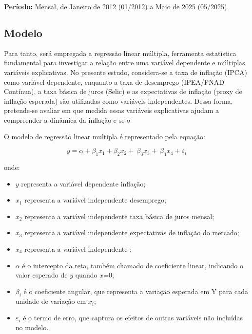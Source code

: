 \documentclass[12pt,oneside]{abntex2}
\begin{document}
\textbf{Período:} Mensal, de Janeiro de 2012 (01/2012) a Maio de 2025 (05/2025).
\medskip

\subsection{\textbf{Modelo}}

Para tanto, será empregada a regressão linear múltipla, ferramenta estatística fundamental para investigar a relação entre uma variável dependente e múltiplas variáveis explicativas. No presente estudo, considera-se a taxa de inflação (IPCA) como variável dependente, enquanto a taxa de desemprego (IPEA/PNAD Contínua), a taxa básica de juros (Selic) e as expectativas de inflação (proxy de inflação esperada) são utilizadas como variáveis independentes. Dessa forma, pretende-se avaliar em que medida essas variáveis explicativas ajudam a compreender a dinâmica da inflação e se o

O modelo de regressão linear multipla é representado pela equação:

\[
y = \alpha + \beta_1 x_1 + \beta_2 x_2 + \ \beta_3 x_3  +\ \beta_4 x_4 + \varepsilon_i
\]

onde:
\begin{itemize}
    \item $y$ representa a variável dependente inflação;

    \item $x_1$ representa a variável independente desemprego;

    \item $x_2$ representa a variável independente taxa básica de juros mensal;

    \item $x_3$ representa a variável independente expectativas de inflação do mercado;

    \item $x_4$ representa a variável independente ;

    \item $\alpha$ é o intercepto da reta, também chamado de coeficiente linear, indicando o valor esperado de $y$ quando $x$=0;

    \item $\beta_i$ é o coeficiente angular, que representa a variação esperada em Y para cada unidade de variação em $x_i$;

    \item $\varepsilon_i$ é o termo de erro, que captura os efeitos de outras variáveis não incluídas no modelo.
\end{itemize}
\end{document}
